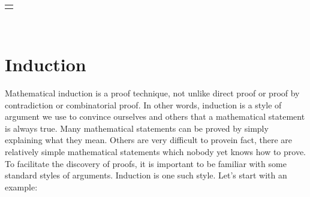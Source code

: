 \documentclass[10pt,]{book}
\theoremstyle{plain}
\theoremstyle{definition}
\theoremstyle{definition}
\theoremstyle{definition}
\numberwithin{equation}{chapter}
\newlength{\panelmax}
\begin{document}
\begin{exerciselist}
{\begin{lrbox}{\panelboxAimage}
{{
}
}\end{lrbox}
\ifdefined\phAimage\else\newlength{\phAimage}\fi%
\setlength{\phAimage}{\ht\panelboxAimage+\dp\panelboxAimage}
\settototalheight{\phAimage}{\usebox{\panelboxAimage}}
\setlength{\panelmax}{\maxof{\panelmax}{\phAimage}}
\leavevmode%
\setlength{\tabcolsep}{0\linewidth}
\par\medskip\noindent
\hspace*{0.4\linewidth}%
\begin{tabular}{@{}*{1}{c}@{}}
\begin{minipage}[c][\panelmax][t]{0.2\linewidth}\usebox{\panelboxAimage}\end{minipage}\end{tabular}\\
}%
\par\smallskip
\end{exerciselist}
\typeout{************************************************}
\typeout{************************************************}
\section[{Induction}]{Induction}\label{sec_background-induction}
\hypertarget{p-2580}{}%
 Mathematical induction is a proof technique, not unlike direct proof or proof by contradiction or combinatorial proof. In other words, induction is a style of argument we use to convince ourselves and others that a mathematical statement is always true. Many mathematical statements can be proved by simply explaining what they mean. Others are very difficult to prove\textemdash{}in fact, there are relatively simple mathematical statements which nobody yet knows how to prove. To facilitate the discovery of proofs, it is important to be familiar with some standard styles of arguments. Induction is one such style. Let's start with an example:%
\typeout{************************************************}
\typeout{************************************************}
\end{document}
